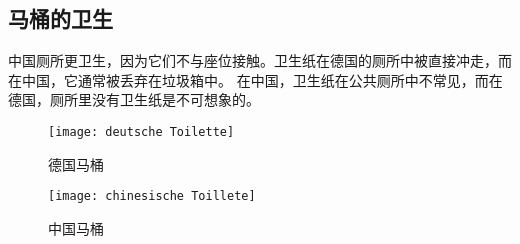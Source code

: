 \subsection{马桶的卫生}
    中国厕所更卫生，因为它们不与座位接触。卫生纸在德国的厕所中被直接冲走，而在中国，它通常被丢弃在垃圾箱中。 在中国，卫生纸在公共厕所中不常见，而在德国，厕所里没有卫生纸是不可想象的。

    \begin{figure}[htb]
        \centering
        \texttt{[image: deutsche Toilette]}
        \caption{德国马桶}
    \end{figure}

    \begin{figure}[htb]
        \centering
        \texttt{[image: chinesische Toillete]}
        \caption{中国马桶}
    \end{figure}